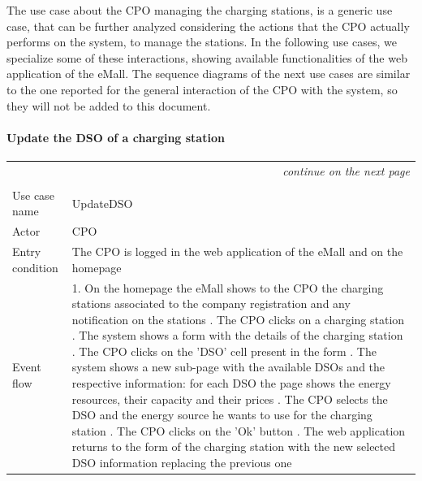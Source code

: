 The use case about the CPO managing the charging stations, is a generic use case, that can be further analyzed considering the actions that the CPO actually performs on the system, to manage the stations. In the following use cases, we specialize some of these interactions, showing available functionalities of the web application of the eMall. The sequence diagrams of the next use cases are similar to the one reported for the general interaction of the CPO with the system, so they will not be added to this document.

\paragraph{Update the DSO of a charging station}
\begin{center}
    \begin{longtable}{p{4cm} p{11cm}}
    \multicolumn{2}{r}{\itshape{continue on the next page}}\\
    \endfoot 
    \\
    \endlastfoot
    \hline
     Use case name &  UpdateDSO\\
     \hline
     Actor & CPO \\
     \hline
     Entry condition & The CPO is logged in the web application of the eMall and on the homepage \\
     \hline
     Event flow &   1. On the homepage the eMall shows to the CPO the charging stations associated to the company                   registration and any notification on the stations \newline
                    2. The CPO clicks on a charging station \newline 
                    3. The system shows a form with the details of the charging station \newline
                    4. The CPO clicks on the 'DSO' cell present in the form \newline
                    5. The system shows a new sub-page with the available DSOs and the respective information: for each DSO the page shows the energy resources, their capacity and their prices \newline
                    6. The CPO selects the DSO and the energy source he wants to use for the charging station \newline
                    7. The CPO clicks on the 'Ok' button \newline
                    8. The web application returns to the form of the charging station with the new selected DSO information replacing the previous one \newline

\end{longtable}
\end{center}

